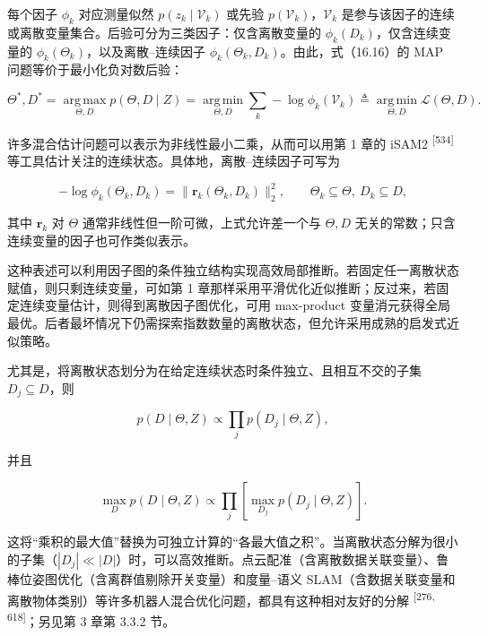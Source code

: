 每个因子 $\phi_k$ 对应测量似然 $p(z_k\mid\mathcal{V}_k)$ 或先验 $p(\mathcal{V}_k)$，$\mathcal{V}_k$ 是参与该因子的连续或离散变量集合。后验可分为三类因子：仅含离散变量的 $\phi_k(D_k)$，仅含连续变量的 $\phi_k(\Theta_k)$，以及离散--连续因子 $\phi_k(\Theta_k,D_k)$。由此，式（16.16）的 MAP 问题等价于最小化负对数后验：

\begin{equation}
\Theta^{*},D^{*}=\operatorname*{arg\,max}_{\Theta,D}p(\Theta,D\mid Z)
=\operatorname*{arg\,min}_{\Theta,D}\sum_k-\log\phi_k(\mathcal{V}_k)
\triangleq\operatorname*{arg\,min}_{\Theta,D}\mathcal{L}(\Theta,D).\tag{16.18}
\end{equation}

许多混合估计问题可以表示为非线性最小二乘，从而可以用第 1 章的 iSAM2 \textsuperscript{[534]} 等工具估计关注的连续状态。具体地，离散--连续因子可写为

\begin{equation}
-\log\phi_k(\Theta_k,D_k)=\|\boldsymbol{r}_k(\Theta_k,D_k)\|_2^2,\qquad
\Theta_k\subseteq\Theta,\ D_k\subseteq D,\tag{16.19}
\end{equation}

其中 $\boldsymbol{r}_k$ 对 $\Theta$ 通常非线性但一阶可微，上式允许差一个与 $\Theta,D$ 无关的常数；只含连续变量的因子也可作类似表示。

这种表述可以利用因子图的条件独立结构实现高效局部推断。若固定任一离散状态赋值，则只剩连续变量，可如第 1 章那样采用平滑优化近似推断；反过来，若固定连续变量估计，则得到离散因子图优化，可用 max-product 变量消元获得全局最优。后者最坏情况下仍需探索指数数量的离散状态，但允许采用成熟的启发式近似策略。

尤其是，将离散状态划分为在给定连续状态时条件独立、且相互不交的子集 $D_j\subseteq D$，则

\begin{equation}
p(D\mid\Theta,Z)\propto\prod_jp(D_j\mid\Theta,Z),\tag{16.20}
\end{equation}

并且

\begin{equation}
\max_Dp(D\mid\Theta,Z)\propto
\prod_j\left[\max_{D_j}p(D_j\mid\Theta,Z)\right].\tag{16.21}
\end{equation}

这将“乘积的最大值”替换为可独立计算的“各最大值之积”。当离散状态分解为很小的子集（$|D_j|\ll|D|$）时，可以高效推断。点云配准（含离散数据关联变量）、鲁棒位姿图优化（含离群值剔除开关变量）和度量--语义 SLAM（含数据关联变量和离散物体类别）等许多机器人混合优化问题，都具有这种相对友好的分解 \textsuperscript{[276, 618]}；另见第 3 章第 3.3.2 节。

